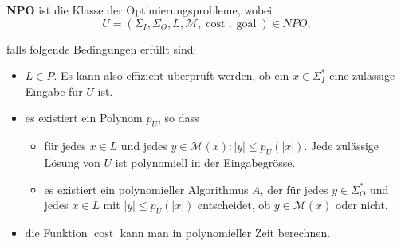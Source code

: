 \begin{definition}
\textbf{NPO} ist die Klasse der Optimierungsprobleme, wobei
\[
U = (\Sigma_I, \Sigma_O, L, \mathcal{M}, \operatorname{cost}, \operatorname{goal}) \in NPO,
\]

falls folgende Bedingungen erfüllt sind:
\begin{itemize}
  \item \(L \in P\). Es kann also effizient überprüft werden, ob ein \(x \in \Sigma_I^*\) eine zulässige Eingabe für \(U\) ist.
  \item es existiert ein Polynom \(p_U\), so dass
  \begin{itemize}
    \item für jedes \(x \in L\) und jedes \(y \in \mathcal{M}(x): |y| \leq p_U(|x|)\). Jede zulässige Lösung von \(U\) ist polynomiell in der Eingabegrösse.
    \item es existiert ein polynomieller Algorithmus \(A\), der für jedes \(y \in \Sigma_O^*\) und jedes \(x \in L\) mit \(|y| \leq p_U(|x|)\) entscheidet, ob \(y \in \mathcal{M}(x)\) oder nicht.
  \end{itemize}
  \item die Funktion \(\operatorname{cost}\) kann man in polynomieller Zeit berechnen.
\end{itemize}
\end{definition}

